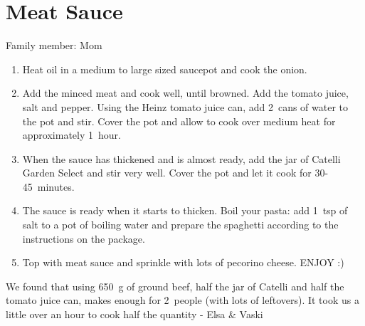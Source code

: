\chapter{Meat Sauce}
\label{ch:meatsauce}


Family member: Mom

\begin{enumerate}
    \item Heat oil in a medium to large sized saucepot and cook the onion.
    \item Add the minced meat and cook well, until browned. Add the tomato juice, salt and pepper. Using the Heinz tomato juice can, add 2~cans of water to the pot and stir. Cover the pot and allow to cook over medium heat for approximately 1~hour.
    \item When the sauce has thickened and is almost ready, add the jar of Catelli Garden Select and stir very well. Cover the pot and let it cook for 30-45~minutes.
    \item The sauce is ready when it starts to thicken. Boil your pasta: add 1~tsp of salt to a pot of boiling water and prepare the spaghetti according to the instructions on the package.
    \item Top with meat sauce and sprinkle with lots of pecorino cheese. ENJOY :)
\end{enumerate}

We found that using 650~g of ground beef, half the jar of Catelli and half the tomato juice can, makes enough for 2~people (with lots of leftovers). It took us a little over an hour to cook half the quantity - Elsa \& Vaski

